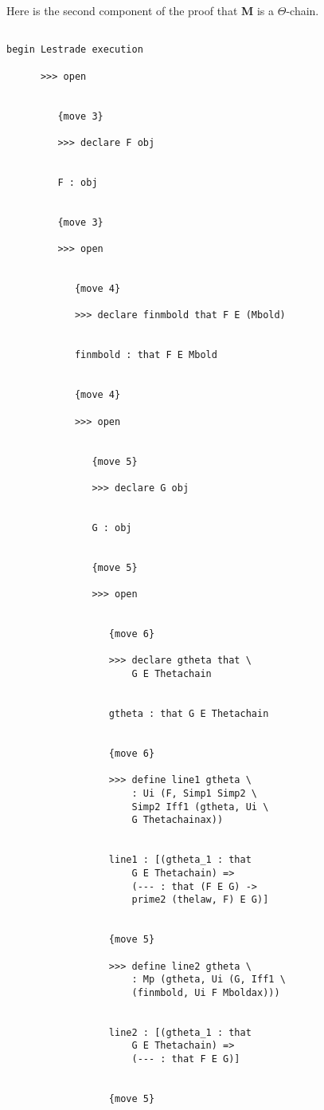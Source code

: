\documentclass[12pt]{article}
\begin{document}
Here is the second component of the proof that {\bf M} is a $\Theta$-chain.

\begin{verbatim}

begin Lestrade execution

      >>> open


         {move 3}

         >>> declare F obj


         F : obj


         {move 3}

         >>> open


            {move 4}

            >>> declare finmbold that F E (Mbold)


            finmbold : that F E Mbold


            {move 4}

            >>> open


               {move 5}

               >>> declare G obj


               G : obj


               {move 5}

               >>> open


                  {move 6}

                  >>> declare gtheta that \
                      G E Thetachain


                  gtheta : that G E Thetachain


                  {move 6}

                  >>> define line1 gtheta \
                      : Ui (F, Simp1 Simp2 \
                      Simp2 Iff1 (gtheta, Ui \
                      G Thetachainax))


                  line1 : [(gtheta_1 : that 
                      G E Thetachain) => 
                      (--- : that (F E G) -> 
                      prime2 (thelaw, F) E G)]


                  {move 5}

                  >>> define line2 gtheta \
                      : Mp (gtheta, Ui (G, Iff1 \
                      (finmbold, Ui F Mboldax)))


                  line2 : [(gtheta_1 : that 
                      G E Thetachain) => 
                      (--- : that F E G)]


                  {move 5}


\end{verbatim}
\end{document}
